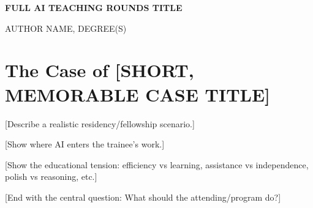 \documentclass[12pt]{article}
\newcommand{\ArticleTitle}{FULL AI TEACHING ROUNDS TITLE}
\newcommand{\AuthorName}{AUTHOR NAME, DEGREE(S)}
\newcommand{\CaseTitle}{The Case of [SHORT, MEMORABLE CASE TITLE]}
\begin{document}

\begin{center}
	{\Large\bfseries \ArticleTitle\par}

	\vspace{0.8em}

	\AuthorName
\end{center}

\vspace{1em}


\section*{\CaseTitle}


 [Describe a realistic residency/fellowship scenario.]

 [Show where AI enters the trainee's work.]

 [Show the educational tension: efficiency vs learning, assistance vs
  independence, polish vs reasoning, etc.]

 [End with the central question:
  What should the attending/program do?]


\end{document}
